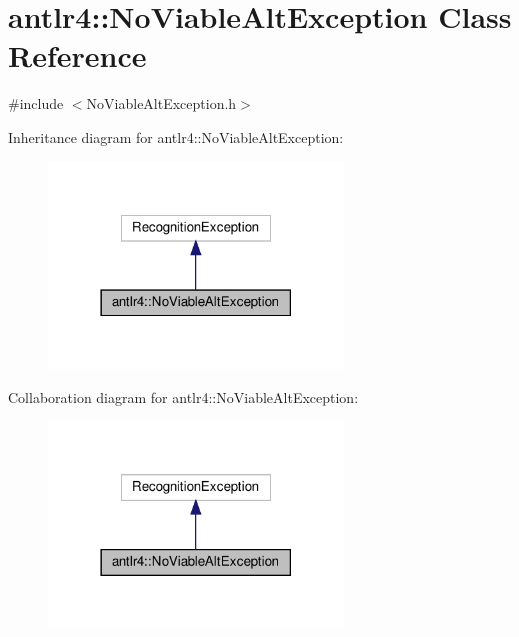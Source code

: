 \hypertarget{classantlr4_1_1NoViableAltException}{}\section{antlr4\+:\+:No\+Viable\+Alt\+Exception Class Reference}
\label{classantlr4_1_1NoViableAltException}


{\ttfamily \#include $<$No\+Viable\+Alt\+Exception.\+h$>$}



Inheritance diagram for antlr4\+:\+:No\+Viable\+Alt\+Exception\+:
\nopagebreak
\begin{figure}[H]
\begin{center}
\leavevmode
\includegraphics[width=222pt]{classantlr4_1_1NoViableAltException__inherit__graph}
\end{center}
\end{figure}


Collaboration diagram for antlr4\+:\+:No\+Viable\+Alt\+Exception\+:
\nopagebreak
\begin{figure}[H]
\begin{center}
\leavevmode
\includegraphics[width=222pt]{classantlr4_1_1NoViableAltException__coll__graph}
\end{center}
\end{figure}
